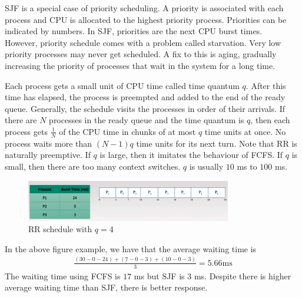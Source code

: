 \documentclass[a4paper]{article}
\theoremstyle{plain}
\theoremstyle{definition}
\newtheorem{defn}{Definition}[section]
\theoremstyle{remark}
\begin{document}
\begin{tcolorbox}[colback=black!3!white,colframe=black!60!white,title=\begin{defn}Priority Scheduling \label{Priority Scheduling}\end{defn}]
SJF is a special case of priority scheduling. A priority is associated with each process and CPU is allocated to the highest priority process. Priorities can be indicated by numbers. In SJF, priorities are the next CPU burst times. \\

However, priority schedule comes with a problem called starvation. Very low priority processes may never get scheduled. A fix to this is aging, gradually increasing the priority of processes that wait in the system for a long time.
\end{tcolorbox}
\begin{tcolorbox}[colback=black!3!white,colframe=black!60!white,title=\begin{defn}Round Roubin (RR) Scheduling \label{Round Roubin (RR}\end{defn}]
Each process gets a small unit of CPU time called time quantum $q$. After this time has elapsed, the process is preempted and added to the end of the ready queue. Generally, the schedule visits the processes in order of their arrivals. If there are $N$ processes in the ready queue and the time quantum is $q$, then each process gets $\frac{1}{N}$ of the CPU time in chunks of at most $q$ time units at once. No process waits more than $\left( N-1 \right) q$ time units for its next turn. Note that RR is naturally preemptive. If $q$ is large, then it imitates the behaviour of FCFS. If  $q$ is small, then there are too many context switches. $q$ is usually $10$ ms to $100$ ms.
\begin{figure}[H]
	\centering
	\includegraphics[width=0.8\textwidth]{thirtynine.png}
	\caption{RR schedule with $q=4$}
	\label{fig:thirtynine-png}
\end{figure}
In the above figure example, we have that the average waiting time is
\begin{align*}
	\frac{\left( 30-0-24 \right) +\left( 7-0-3 \right) +\left( 10-0-3 \right) }{3} = 5.66\text{ms}
\end{align*}
The waiting time using FCFS is $17$ ms but SJF is $3$ ms. Despite there is higher average waiting time than SJF, there is better response.
\end{tcolorbox}
\end{document}
